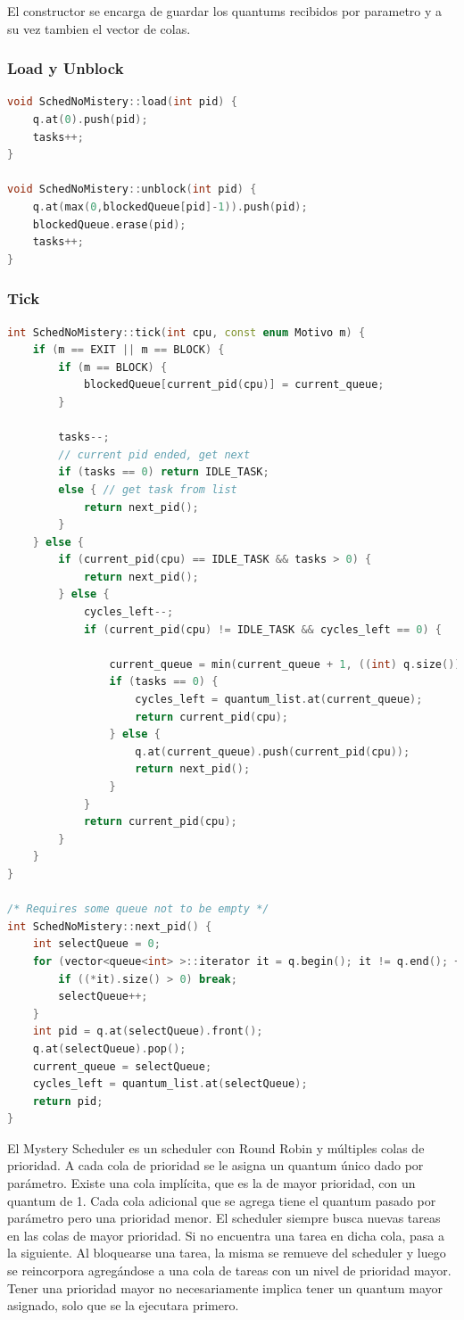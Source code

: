 El constructor se encarga de guardar los quantums recibidos por parametro y a su vez tambien el vector de colas.

\subsubsection{Load y Unblock}
\begin{lstlisting}[language=C++, breaklines=true]
void SchedNoMistery::load(int pid) {
	q.at(0).push(pid);
	tasks++;
}

void SchedNoMistery::unblock(int pid) {
	q.at(max(0,blockedQueue[pid]-1)).push(pid);
	blockedQueue.erase(pid);
	tasks++;
}
\end{lstlisting}


\subsubsection{Tick}
\begin{lstlisting}[language=C++, breaklines=true]
int SchedNoMistery::tick(int cpu, const enum Motivo m) {
	if (m == EXIT || m == BLOCK) {
		if (m == BLOCK) {
			blockedQueue[current_pid(cpu)] = current_queue;
		}
		
		tasks--;
		// current pid ended, get next
		if (tasks == 0) return IDLE_TASK;
		else { // get task from list
			return next_pid();
		}
	} else {
		if (current_pid(cpu) == IDLE_TASK && tasks > 0) {
			return next_pid();
		} else {
			cycles_left--;
			if (current_pid(cpu) != IDLE_TASK && cycles_left == 0) {

				current_queue = min(current_queue + 1, ((int) q.size()) - 1);
				if (tasks == 0) {
					cycles_left = quantum_list.at(current_queue);
					return current_pid(cpu);
				} else {
					q.at(current_queue).push(current_pid(cpu));
					return next_pid();
				}
			}
			return current_pid(cpu);
		}
	}
}

/* Requires some queue not to be empty */
int SchedNoMistery::next_pid() {
	int selectQueue = 0;
	for (vector<queue<int> >::iterator it = q.begin(); it != q.end(); ++it) {
		if ((*it).size() > 0) break;
		selectQueue++;
	}
	int pid = q.at(selectQueue).front();
	q.at(selectQueue).pop();
	current_queue = selectQueue;
	cycles_left = quantum_list.at(selectQueue);
	return pid;
}

\end{lstlisting}

El Mystery Scheduler es un scheduler con Round Robin y múltiples colas de prioridad. A cada cola de prioridad se le asigna un quantum único dado por parámetro. Existe una cola implícita, que es la de mayor prioridad, con un quantum de 1. Cada cola adicional que se agrega tiene el quantum pasado por parámetro pero una prioridad menor. El scheduler siempre busca nuevas tareas en las colas de mayor prioridad. Si no encuentra una tarea en dicha cola, pasa a la siguiente.  Al bloquearse una tarea, la misma se remueve del scheduler y luego se reincorpora agregándose a una cola de tareas con un nivel de prioridad mayor. Tener una prioridad mayor no necesariamente implica tener un quantum mayor asignado, solo que se la ejecutara primero.

